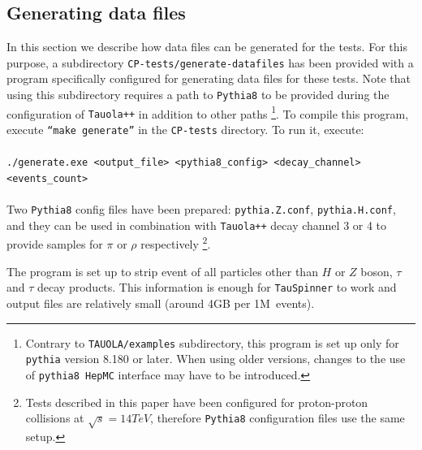 \documentclass[12pt]{article}
\begin{document}
\subsection{Generating data files}
\label{sec:generating_datafiles}

In this section we describe how data files can be generated for the tests.
For this purpose, a subdirectory {\tt CP-tests/generate-datafiles} has been
provided with a program specifically configured for generating data files for
these tests. Note that using this subdirectory requires a path to {\tt Pythia8}
to be provided during the configuration  of {\tt Tauola++} in addition to other
paths%
\footnote{Contrary to {\tt TAUOLA/examples} subdirectory,
this program is set up only for {\tt pythia} version 8.180 or later. When  using older versions,
changes to the use of {\tt pythia8 HepMC} interface may have to be introduced.}.
To compile this program, execute {\tt ``make generate''} in the {\tt CP-tests}
directory. To run it, execute:\\
\\
{\tt ./generate.exe <output\_file> <pythia8\_config> <decay\_channel> <events\_count>} \\
\\
Two {\tt Pythia8} config files have been prepared: {\tt pythia.Z.conf}, {\tt pythia.H.conf},
and they can be used in combination with {\tt Tauola++} decay channel 3 or 4 to provide
samples for $\pi$ or $\rho$ respectively%
\footnote{Tests described in this paper have been configured for proton-proton collisions
at $\sqrt{s} = 14 TeV$, therefore {\tt Pythia8} configuration files use the same setup.}.

The program is set up to strip event of all particles other than $H$ or $Z$ boson,
$\tau$ and $\tau$ decay products. This information is enough for {\tt TauSpinner}
to work and output files are relatively small (around 4GB per 1M~events).
\end{document}
